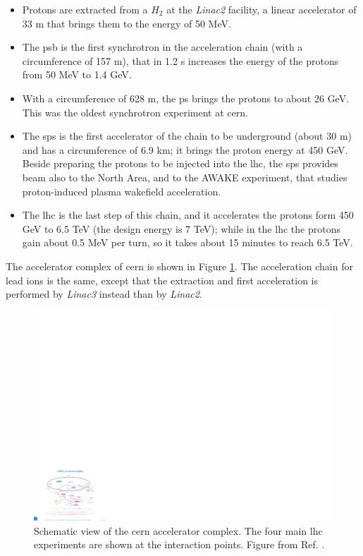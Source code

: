 \begin{itemize}
\item Protons are extracted from a $H_2$ at the \textit{Linac2} facility, a linear accelerator of 33 m that brings them to the energy of 50 MeV.
\item The \gls{psb} is the first synchrotron in the acceleration chain (with a circumference of 157 m), that in 1.2 s increases the energy of the protons from 50 MeV to 1.4 GeV.
\item With a circumference of 628 m, the \gls{ps} brings the protons to about 26 GeV. This was the oldest synchrotron experiment at \gls{cern}.
\item The \gls{sps} is the first accelerator of the chain to be underground (about 30 m) and has a circumference of 6.9 km; it brings the proton energy at 450 GeV. Beside preparing the protons to be injected into the \gls{lhc}, the \gls{sps} provides beam also to the North Area, and to the AWAKE experiment, that studies proton-induced plasma wakefield acceleration.
\item The \gls{lhc} is the last step of this chain, and it accelerates the protons form 450 GeV to 6.5 TeV (the design energy is 7 TeV); while in the \gls{lhc} the protons gain about 0.5 MeV per turn, so it takes about 15 minutes to reach 6.5 TeV.
\end{itemize}

The accelerator complex of \gls{cern} is shown in Figure \ref{fig:lhc:acc}. The acceleration chain for lead ions is the same, except that the extraction and first acceleration is performed by \textit{Linac3} instead than by \textit{Linac2}.

\begin{figure}[ht]
\centering
\includegraphics[width=1\textwidth]{figures/lhc/acc_complex.pdf}
\caption{ Schematic view of the \gls{cern} accelerator complex. The four main \gls{lhc} experiments are shown at the interaction points. Figure from Ref. \cite{Christiane:1260465}.}
\label{fig:lhc:acc}
\end{figure}

